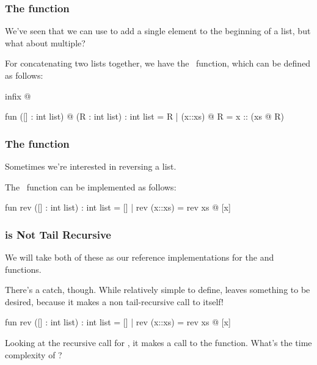 \documentclass[aspectratio=169]{beamer}
\begin{document}


\begin{frame}[fragile]
  \frametitle{The  function}

  We've seen that we can use \code{::} to add a single element to the beginning of a list, 
  but what about multiple? 

  \pause
  \vspace{\fill}

  For concatenating two lists together, we have the \footnotemark \, function, which 
  can be defined as follows:

  \pause
  \begin{codeblock}
    infix @ 

    fun ([] : int list) @ (R : int list) : int list = R  
      | (x::xs) @ R = x :: (xs @ R) 
  \end{codeblock}

\end{frame}

\begin{frame}[fragile]
  \frametitle{The  function}

  Sometimes we're interested in reversing a list.

  \pause
  \vspace{\fill}

  The \footnotemark \, function can be implemented as follows:

  \pause
  \begin{codeblock}
    fun rev ([] : int list) : int list = []
      | rev (x::xs) = rev xs @ [x] 
  \end{codeblock}

\end{frame}

\begin{frame}[fragile]
  \frametitle{ is Not Tail Recursive}

  We will take both of these as our reference implementations for the  and 
  functions.

  \pause
  \vspace{\fill}

  There's a catch, though. While relatively simple to define,  leaves something to be
  desired, because it makes a non tail-recursive call to itself!

  \begin{codeblock}
    fun rev ([] : int list) : int list = []
      | rev (x::xs) = rev xs @ [x] 
  \end{codeblock}

  \pause
  \vspace{\fill}

  Looking at the recursive call for , it makes a call to the  function. What's
  the time complexity of ?
\end{frame}
\end{document}
